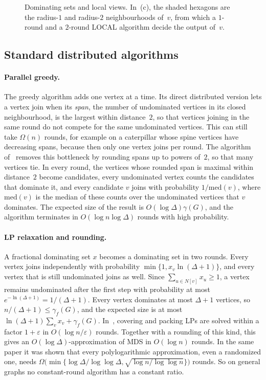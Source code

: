 \documentclass[11pt]{article}
\theoremstyle{remark}
\begin{document}
\begin{figure}[t]\centering

\caption{Dominating sets and local views. In~(c), the shaded hexagons are the radius-$1$ and
radius-$2$ neighbourhoods of~$v$, from which a $1$-round and a $2$-round LOCAL algorithm decide
the output of~$v$.}
\label{fig:basics}
\end{figure}

\subsection{Standard distributed algorithms}

\paragraph{Parallel greedy.} The greedy algorithm adds one vertex at a time. Its direct distributed
version lets a vertex join when its \emph{span}, the number of undominated vertices in its closed
neighbourhood, is the largest within distance~$2$, so that vertices joining in the same round do not
compete for the same undominated vertices. This can still take $\Omega(n)$ rounds, for example on a
caterpillar whose spine vertices have decreasing spans, because then only one vertex joins per
round. The algorithm of~\cite{JRS02} removes this bottleneck by rounding spans up to powers of~$2$,
so that many vertices tie. In every round, the vertices whose rounded span is maximal within
distance~$2$ become candidates, every undominated vertex counts the candidates that dominate it, and
every candidate $v$ joins with probability $1/\mathrm{med}(v)$, where $\mathrm{med}(v)$ is the
median of these counts over the undominated vertices that $v$ dominates. The expected size of the
result is $O(\log\Delta)\gamma(G)$, and the algorithm terminates in $O(\log n\log\Delta)$ rounds
with high probability.

\paragraph{LP relaxation and rounding.} A fractional dominating set $x$ becomes a dominating set in
two rounds. Every vertex joins independently with probability $\min\{1,x_v\ln(\Delta+1)\}$, and
every vertex that is still undominated joins as well. Since $\sum_{u\in N[v]}x_u\ge1$, a vertex
remains undominated after the first step with probability at most $e^{-\ln(\Delta+1)}=1/(\Delta+1)$.
Every vertex dominates at most $\Delta+1$ vertices, so $n/(\Delta+1)\le\gamma_f(G)$, and the expected
size is at most $\ln(\Delta+1)\sum_vx_v+\gamma_f(G)$. In~\cite{KMW16}, covering and packing LPs are
solved within a factor $1+\varepsilon$ in $O(\log n/\varepsilon)$ rounds. Together with a rounding of
this kind, this gives an $O(\log\Delta)$-approximation of MDS in $O(\log n)$ rounds. In the same
paper it was shown that every polylogarithmic approximation, even a randomized one, needs
$\Omega\big(\min\{\log\Delta/\log\log\Delta,\sqrt{\log n/\log\log n}\}\big)$ rounds. So on general
graphs no constant-round algorithm has a constant ratio.
\end{document}

